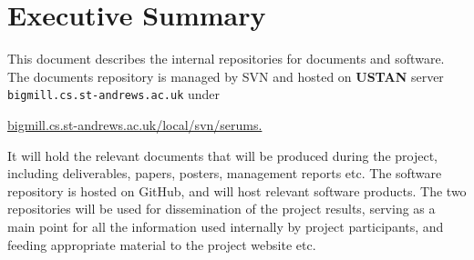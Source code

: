 
\section*{Executive Summary}
This document describes the \Serums{} internal repositories for documents and software. 
The documents repository is managed by SVN and hosted on \textbf{USTAN}
server \lstinline{bigmill.cs.st-andrews.ac.uk}
under

\url{bigmill.cs.st-andrews.ac.uk/local/svn/serums.}

\noindent
  It will hold the relevant documents 
that will be produced during the project, including deliverables, papers, posters, management reports etc.
The software repository is hosted on GitHub, and will host relevant software products. The two
repositories will be used for dissemination of the project results, serving as a main point for all
the information used internally by project participants, and feeding appropriate material to
the project website etc.

